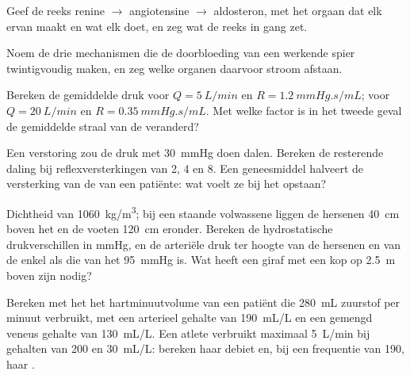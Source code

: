 \begin{exercise}[$\star$]\label{exo:b2:blood-pressure:3}
Geef de reeks renine $\to$ angiotensine $\to$ aldosteron, met het orgaan dat
elk ervan maakt en wat elk doet, en zeg wat de reeks in gang zet.
\end{exercise}

\begin{exercise}[$\star$]\label{exo:b2:blood-pressure:4}
Noem de drie mechanismen die de doorbloeding van een werkende spier
twintigvoudig maken, en zeg welke organen daarvoor stroom afstaan.
\end{exercise}

\begin{exercise}[$\star\star$]\label{exo:b2:blood-pressure:5}
Bereken de gemiddelde druk voor $Q = \qty{5}{L/min}$ en $R =
\qty{1.2}{mmHg.s/mL}$; voor $Q = \qty{20}{L/min}$ en $R =
\qty{0.35}{mmHg.s/mL}$. Met welke factor is in het tweede geval de
gemiddelde straal van de  veranderd?
\end{exercise}

\begin{exercise}[$\star\star$]\label{exo:b2:blood-pressure:6}
Een verstoring zou de druk met \qty{30}{mmHg} doen dalen. Bereken de
resterende daling bij reflexversterkingen van 2, 4 en 8. Een geneesmiddel
halveert de versterking van de  van een patiënte: wat voelt ze
bij het opstaan?
\end{exercise}

\begin{exercise}[$\star\star$]\label{exo:b2:blood-pressure:7}
Dichtheid van  \qty{1060}{kg/m^3}; bij een staande volwassene liggen de
hersenen \qty{40}{cm} boven het  en de voeten \qty{120}{cm} eronder.
Bereken de hydrostatische drukverschillen in mmHg, en de arteriële druk ter
hoogte van de hersenen en van de enkel als die van het 
\qty{95}{mmHg} is. Wat heeft een giraf met een kop op \qty{2.5}{m} boven
zijn  nodig?
\end{exercise}

\begin{exercise}[$\star\star$]\label{exo:b2:blood-pressure:8}
Bereken met het  het hartminuutvolume van een patiënt die
\qty{280}{mL} zuurstof per minuut verbruikt, met een arterieel gehalte van
\qty{190}{mL/L} en een gemengd veneus gehalte van \qty{130}{mL/L}. Een
atlete verbruikt maximaal \qty{5}{L/min} bij gehalten van 200 en
\qty{30}{mL/L}: bereken haar debiet en, bij een frequentie van 190, haar
.
\end{exercise}

